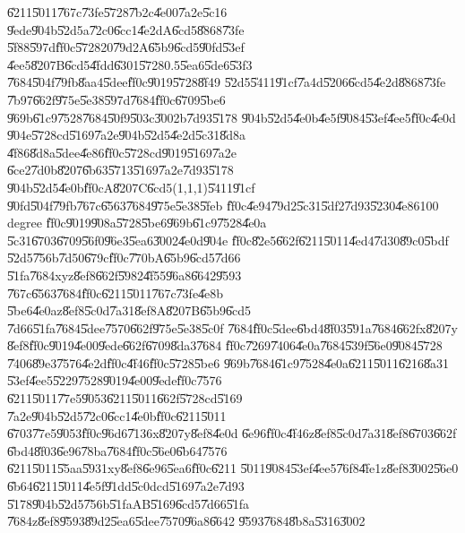 \documentclass[12pt,a4paper]{article}
\begin{document}
\U{6211}\U{5011}\U{767c}\U{73fe}\U{5728}\U{7b2c}\U{4e00}\U{7a2e}\U{5c16}%
\U{9ede}\U{904b}\U{52d5}a\U{72c0}\U{6cc1}\U{4e2d}A\U{6cd5}\U{8868}\U{73fe}%
\U{5f88}\U{597d}\U{ff0c}\U{5728}20\U{79d2}A\U{65b9}\U{6cd5}\U{90fd}\U{53ef}%
\U{4ee5}\U{8207}B\U{6cd5}\U{4fdd}\U{6301}\U{5728}0.5\U{5ea6}\U{5de6}\U{53f3}%
\U{7684}\U{504f}\U{79fb}\U{8aa4}\U{5dee}\U{ff0c}\U{9019}\U{5728}\U{8f49}%
\U{52d5}\U{5411}\U{91cf}\U{7a4d}\U{5206}\U{6cd5}\U{4e2d}\U{8868}\U{73fe}%
\U{7b97}\U{662f}\U{975e}\U{5e38}\U{597d}\U{7684}\U{ff0c}\U{6709}\U{5be6}%
\U{969b}\U{61c9}\U{7528}\U{7684}\U{50f9}\U{503c}\U{3002}b\U{7d93}\U{5178}%
\U{904b}\U{52d5}\U{4e0b}\U{4e5f}\U{9084}\U{53ef}\U{4ee5}\U{ff0c}\U{4e0d}%
\U{904e}\U{5728}cd\U{5169}\U{7a2e}\U{904b}\U{52d5}\U{4e2d}\U{5c31}\U{8d8a}%
\U{4f86}\U{8d8a}\U{5dee}\U{4e86}\U{ff0c}\U{5728}cd\U{9019}\U{5169}\U{7a2e}%
\U{6ce2}\U{7d0b}\U{8207}\U{6b63}\U{5713}\U{5169}\U{7a2e}\U{7d93}\U{5178}%
\U{904b}\U{52d5}\U{4e0b}\U{ff0c}A\U{8207}C\U{6cd5}(1,1,1)\U{5411}\U{91cf}%
\U{90fd}\U{504f}\U{79fb}\U{767c}\U{6563}\U{7684}\U{975e}\U{5e38}\U{5feb}%
\U{ff0c}\U{4e94}\U{79d2}\U{5c31}\U{5df2}\U{7d93}\U{5230}\U{4e86}100 degree%
\U{ff0c}\U{9019}\U{908a}\U{5728}\U{5be6}\U{969b}\U{61c9}\U{7528}\U{4e0a}%
\U{5c31}\U{6703}\U{6709}\U{56f0}\U{96e3}\U{5ea6}\U{3002}\U{4e0d}\U{904e}%
\U{ff0c}\U{82e5}\U{662f}\U{6211}\U{5011}\U{4ed4}\U{7d30}\U{89c0}\U{5bdf}%
\U{52d5}\U{756b}\U{7d50}\U{679c}\U{ff0c}\U{770b}A\U{65b9}\U{6cd5}\U{7d66}%
\U{51fa}\U{7684}xyz\U{8ef8}\U{662f}\U{5982}\U{4f55}\U{96a8}\U{6642}\U{9593}%
\U{767c}\U{6563}\U{7684}\U{ff0c}\U{6211}\U{5011}\U{767c}\U{73fe}\U{4e8b}%
\U{5be6}\U{4e0a}z\U{8ef8}\U{5c0d}\U{7a31}\U{8ef8}A\U{8207}B\U{65b9}\U{6cd5}%
\U{7d66}\U{51fa}\U{7684}\U{5dee}\U{7570}\U{662f}\U{975e}\U{5e38}\U{5c0f}%
\U{7684}\U{ff0c}\U{5dee}\U{6bd4}\U{8f03}\U{591a}\U{7684}\U{662f}x\U{8207}y%
\U{8ef8}\U{ff0c}\U{9019}\U{4e00}\U{9ede}\U{662f}\U{6709}\U{8da3}\U{7684}%
\U{ff0c}\U{7269}\U{7406}\U{4e0a}\U{7684}\U{539f}\U{56e0}\U{9084}\U{5728}%
\U{7406}\U{89e3}\U{7576}\U{4e2d}\U{ff0c}\U{4f46}\U{ff0c}\U{5728}\U{5be6}%
\U{969b}\U{7684}\U{61c9}\U{7528}\U{4e0a}\U{6211}\U{5011}\U{6216}\U{8a31}%
\U{53ef}\U{4ee5}\U{5229}\U{7528}\U{9019}\U{4e00}\U{9ede}\U{ff0c}\U{7576}%
\U{6211}\U{5011}\U{77e5}\U{9053}\U{6211}\U{5011}\U{662f}\U{5728}cd\U{5169}%
\U{7a2e}\U{904b}\U{52d5}\U{72c0}\U{6cc1}\U{4e0b}\U{ff0c}\U{6211}\U{5011}%
\U{6703}\U{77e5}\U{9053}\U{ff0c}\U{96d6}\U{7136}x\U{8207}y\U{8ef8}\U{4e0d}%
\U{6e96}\U{ff0c}\U{4f46}z\U{8ef8}\U{5c0d}\U{7a31}\U{8ef8}\U{6703}\U{662f}%
\U{6bd4}\U{8f03}\U{6e96}\U{78ba}\U{7684}\U{ff0c}\U{56e0}\U{6b64}\U{7576}%
\U{6211}\U{5011}\U{55aa}\U{5931}xy\U{8ef8}\U{6e96}\U{5ea6}\U{ff0c}\U{6211}%
\U{5011}\U{9084}\U{53ef}\U{4ee5}\U{76f8}\U{4fe1}z\U{8ef8}\U{3002}\U{56e0}%
\U{6b64}\U{6211}\U{5011}\U{4e5f}\U{91dd}\U{5c0d}cd\U{5169}\U{7a2e}\U{7d93}%
\U{5178}\U{904b}\U{52d5}\U{756b}\U{51fa}AB\U{5169}\U{6cd5}\U{7d66}\U{51fa}%
\U{7684}z\U{8ef8}\U{9593}\U{89d2}\U{5ea6}\U{5dee}\U{7570}\U{96a8}\U{6642}%
\U{9593}\U{7684}\U{8b8a}\U{5316}\U{3002}
\end{document}
